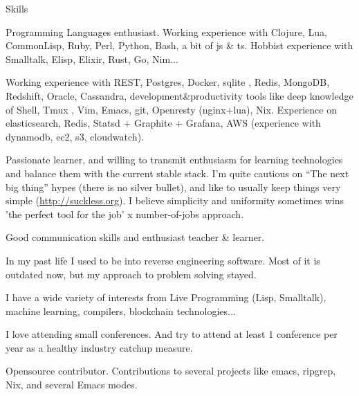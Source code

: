 \documentclass{resume} %
\begin{document}
\begin{rSection}{Skills}

\item Programming Languages enthusiast. Working experience with Clojure,
	Lua, CommonLisp, Ruby, Perl, Python, Bash, a bit of js \& ts. Hobbist
  experience with Smalltalk, Elisp, Elixir, Rust, Go, Nim...

\item Working experience with REST, Postgres, Docker, sqlite , Redis,
  MongoDB, Redshift, Oracle, Cassandra, development\&productivity
  tools like deep knowledge of Shell, Tmux , Vim, Emacs, git,
  Openresty (nginx+lua), Nix. Experience on elasticsearch, Redis,
  Statsd + Graphite + Grafana, AWS (experience with dynamodb, ec2, s3,
  cloudwatch).

\item Passionate learner, and willing to transmit enthusiasm for
  learning technologies and balance them with the current stable
  stack. I'm quite cautious on ``The next big thing'' hypes (there is
  no silver bullet), and like to usually keep things very simple
  (\url{http://suckless.org}). I believe simplicity and uniformity
  sometimes wins 'the perfect tool for the job' x number-of-jobs
  approach.

\item Good communication skills and enthusiast teacher \& learner.

\item In my past life I used to be into reverse engineering
  software. Most of it is outdated now, but my approach to problem
  solving stayed.

\item I have a wide variety of interests from Live Programming (Lisp,
  Smalltalk), machine learning, compilers, blockchain technologies...

\item I love attending small conferences. And try to attend at least 1
  conference per year as a healthy industry catchup measure.

\item Opensource contributor. Contributions to several projects like
  emacs, ripgrep, Nix, and several Emacs modes.
\end{rSection}



\end{document}
